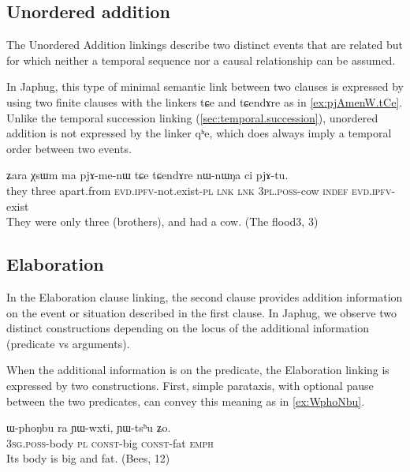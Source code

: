 \documentclass[oldfontcommands,oneside,a4paper,11pt]{article}
\newcommand{\ipa}[1]{{\phon \mbox{#1}}} %
\begin{document}
\subsection{Unordered addition} \label{sec:unordered}
The Unordered Addition linkings describe  two distinct events that are related but for which neither a temporal sequence nor a causal relationship can be assumed. 

In Japhug, this type of minimal semantic link between two clauses is expressed by using two finite clauses with the linkers \ipa{tɕe} and \ipa{tɕendɤre}  as in \ref{ex:pjAmenW.tCe}. Unlike the  temporal succession linking (\ref{sec:temporal.succession}), unordered addition is not expressed by  the linker \ipa{qʰe}, which does always imply a temporal order between two events.

 \begin{exe}
\ex \label{ex:pjAmenW.tCe}
\gll
\ipa{ʑara}  	\ipa{χsɯm}  	\ipa{ma}  	\ipa{pjɤ-me-nɯ}  	\ipa{tɕe}  	\ipa{tɕendɤre}  	\ipa{nɯ-nɯŋa}  	\ipa{ci}  	\ipa{pjɤ-tu.}  \\
they three apart.from \textsc{evd.ipfv}-not.exist-\textsc{pl} \textsc{lnk} \textsc{lnk} \textsc{3pl.poss}-cow \textsc{indef} \textsc{evd.ipfv}-exist \\
\glt They were only three (brothers), and had a cow. (The flood3, 3)
\end{exe}


\subsection{Elaboration} \label{sec:elaboration}
In the Elaboration clause linking, the second clause provides addition information on the event or situation described in the first clause. In Japhug, we observe two distinct constructions depending on the locus of the additional information (predicate vs arguments).


When the additional information is on the predicate, the Elaboration linking is expressed by two constructions. First, simple parataxis, with optional pause between the two predicates, can convey this meaning as in \ref{ex:WphoNbu}.

\begin{exe}
\ex \label{ex:WphoNbu}
\gll
 \ipa{ɯ-phoŋbu}  	\ipa{ra}  	\ipa{ɲɯ-wxti,}  	\ipa{ɲɯ-tsʰu}  	\ipa{ʑo.}  \\
\textsc{ 3sg.poss}-body \textsc{pl} \textsc{const}-big \textsc{const}-fat \textsc{emph} \\
\glt Its body is big and fat. (Bees, 12)
\end{exe}
\end{document}
